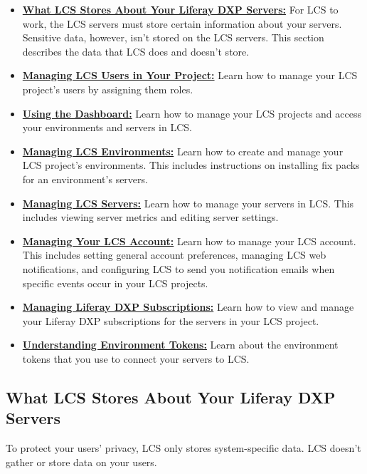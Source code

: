 \begin{itemize}
\item
  \hyperref[what-lcs-stores-about-your-liferay-servers]{\textbf{What LCS
  Stores About Your Liferay DXP Servers:}} For LCS to work, the LCS
  servers must store certain information about your servers. Sensitive
  data, however, isn't stored on the LCS servers. This section describes
  the data that LCS does and doesn't store.
\item
  \hyperref[managing-lcs-users-in-your-project]{\textbf{Managing LCS
  Users in Your Project:}} Learn how to manage your LCS project's users
  by assigning them roles.
\item
  \hyperref[using-the-dashboard]{\textbf{Using the Dashboard:}} Learn
  how to manage your LCS projects and access your environments and
  servers in LCS.
\item
  \hyperref[managing-lcs-environments]{\textbf{Managing LCS
  Environments:}} Learn how to create and manage your LCS project's
  environments. This includes instructions on installing fix packs for
  an environment's servers.
\item
  \hyperref[using-the-server-view]{\textbf{Managing LCS Servers:}} Learn
  how to manage your servers in LCS. This includes viewing server
  metrics and editing server settings.
\item
  \hyperref[managing-your-lcs-account]{\textbf{Managing Your LCS
  Account:}} Learn how to manage your LCS account. This includes setting
  general account preferences, managing LCS web notifications, and
  configuring LCS to send you notification emails when specific events
  occur in your LCS projects.
\item
  \hyperref[managing-liferay-dxp-subscriptions]{\textbf{Managing Liferay
  DXP Subscriptions:}} Learn how to view and manage your Liferay DXP
  subscriptions for the servers in your LCS project.
\item
  \hyperref[using-environment-tokens]{\textbf{Understanding Environment
  Tokens:}} Learn about the environment tokens that you use to connect
  your servers to LCS.
\end{itemize}

\subsection{What LCS Stores About Your Liferay DXP
Servers}\label{what-lcs-stores-about-your-liferay-dxp-servers}

To protect your users' privacy, LCS only stores system-specific data.
LCS doesn't gather or store data on your users.

